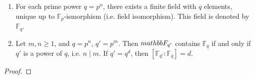 \begin{theorem}
  \label{thm:65}
  \begin{enumerate}
  \item For each prime power $q = p^n$, there exists a finite field with $q$ elements, unique up to $\mathbb{F}_p$-ismorphism (i.e. field isomorphism). This field is denoted by $\mathbb{F}_q$.
  \item Let $m, n \geq 1$, and $q = p^n$, $q' = p^m$. Then $\\mathbb{F}_{q'}$ contains $\mathbb{F}_q$ if and only if $q'$ is a power of $q$, i.e. $n \mid m$. If  $q' = q^d$, then $[\mathbb{F}_{q'} : \mathbb{F}_{q}] = d$.
  \end{enumerate}
\end{theorem}

\begin{proof}
  
\end{proof}

